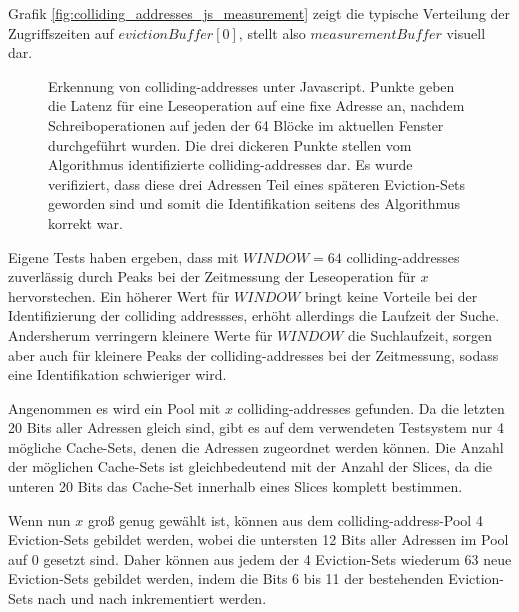 Grafik \ref{fig:colliding_addresses_js_measurement} zeigt die typische Verteilung der Zugriffszeiten auf $evictionBuffer[0]$, stellt also $measurementBuffer$ visuell dar.

\label{fig:colliding_addresses_js_measurement}
\begin{figure}[h]
\centering
\begin{scaletikzpicturetowidth}{\textwidth}

\end{scaletikzpicturetowidth}
\caption{Erkennung von colliding-addresses unter Javascript. Punkte geben die Latenz für eine Leseoperation auf eine fixe Adresse an, nachdem Schreiboperationen auf jeden der 64 Blöcke im aktuellen Fenster durchgeführt wurden. Die drei dickeren Punkte stellen vom Algorithmus identifizierte colliding-addresses dar. Es wurde verifiziert, dass diese drei Adressen Teil eines späteren Eviction-Sets geworden sind und somit die Identifikation seitens des Algorithmus korrekt war.}
\end{figure}

Eigene Tests haben ergeben, dass mit $WINDOW=64$ colliding-addresses zuverlässig durch Peaks bei der Zeitmessung der Leseoperation für $x$ hervorstechen.
Ein höherer Wert für $WINDOW$ bringt keine Vorteile bei der Identifizierung der colliding addressses, erhöht allerdings die Laufzeit der Suche.
Andersherum verringern kleinere Werte für $WINDOW$ die Suchlaufzeit, sorgen aber auch für kleinere Peaks der colliding-addresses bei der Zeitmessung, sodass eine Identifikation schwieriger wird.

Angenommen es wird ein Pool mit $x$ colliding-addresses gefunden.
Da die letzten 20 Bits aller Adressen gleich sind, gibt es auf dem verwendeten Testsystem nur 4 mögliche Cache-Sets, denen die Adressen zugeordnet werden können.
Die Anzahl der möglichen Cache-Sets ist gleichbedeutend mit der Anzahl der Slices, da die unteren 20 Bits das Cache-Set innerhalb eines Slices komplett bestimmen.

Wenn nun $x$ groß genug gewählt ist, können aus dem colliding-address-Pool 4 Eviction-Sets gebildet werden, wobei die untersten 12 Bits aller Adressen im Pool auf 0 gesetzt sind. Daher können aus jedem der 4 Eviction-Sets wiederum 63 neue Eviction-Sets gebildet werden, indem die Bits 6 bis 11 der bestehenden Eviction-Sets nach und nach inkrementiert werden.

